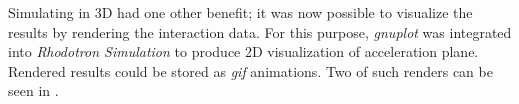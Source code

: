 \documentclass[a4paper,oneside,12pt]{report}
\numberwithin{equation}{chapter}
\begin{document}
Simulating in 3D had one other benefit; it was now possible to visualize the results by rendering the interaction data. 
For this purpose, \textit{gnuplot} was integrated into \textit{Rhodotron Simulation} to produce 2D visualization of acceleration plane. 
Rendered results could be stored as \textit{gif} animations. 
Two of such renders can be seen in .

\end{document}
